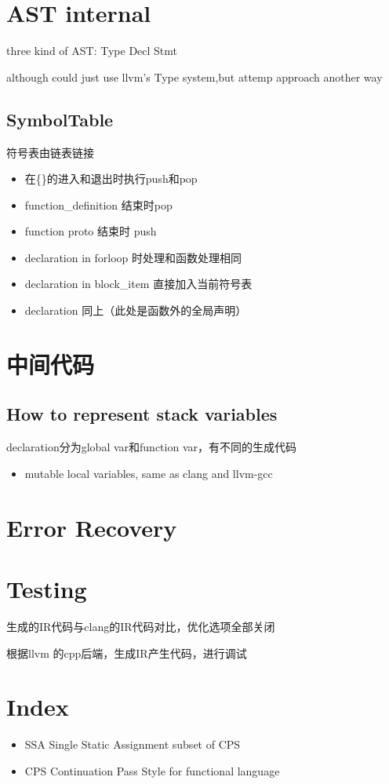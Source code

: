\documentclass[11pt]{article} %
\begin{document}
\section{AST internal}
three kind of AST: Type Decl Stmt

although could just use llvm's Type system,but attemp approach another way
\subsection{SymbolTable}
符号表由链表链接
\begin{itemize}
\item 在\{\}的进入和退出时执行push和pop
\item function\_definition 结束时pop
\item function proto 结束时 push
\item declaration in for\-loop 时处理和函数处理相同
\item declaration in block\_item 直接加入当前符号表
\item declaration 同上（此处是函数外的全局声明）
\end{itemize}

\section{中间代码}

\subsection{How to represent stack variables}
declaration分为global var和function var，有不同的生成代码

\begin{itemize}
\item mutable local variables, same as clang and llvm-gcc
\end{itemize}

\section{Error Recovery}

\section{Testing}
生成的IR代码与clang的IR代码对比，优化选项全部关闭


根据llvm 的cpp后端，生成IR产生代码，进行调试

\section{Index}
\begin{itemize}
\item SSA Single Static Assignment subset of CPS
\item CPS Continuation Pass Style for functional language
\end{itemize}
\end{document}
